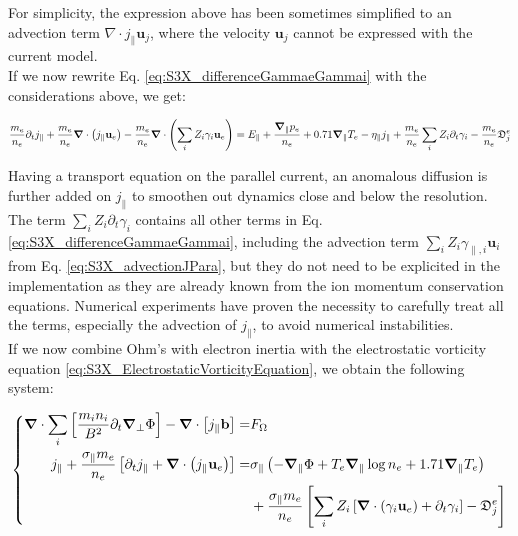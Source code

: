 For simplicity, the expression above has been sometimes simplified to an advection term $\nabla\cdot j_\parallel \mathbf{u}_j$, where the velocity $\mathbf{u}_j$ cannot be expressed with the current model. \\

If we now rewrite Eq. \ref{eq:S3X_differenceGammaeGammai} with the considerations above, we get: 

\begin{equation}
	\label{eq:S3X_OhmLawElectronInertia}
	\frac{m_e}{n_e}\partial_t j_\parallel + \frac{m_e}{n_e}\grad\cdot\left(j_\parallel\mathbf{u}_e\right)  - \frac{m_e}{n_e}\grad\cdot\left(\sum_i Z_i\gamma_i\mathbf{u}_e\right) = E_\parallel + \frac{\grad_\parallel p_e}{n_e} + 0.71\grad_\parallel T_e - \eta_\parallel j_\parallel + \frac{m_e}{n_e}\sum_i Z_i \partial_t \gamma_i - \frac{m_e}{n_e}\mathfrak{D}_j^e
\end{equation}

Having a transport equation on the parallel current, an anomalous diffusion is further added on $j_\parallel$ to smoothen out dynamics close and below the resolution. The term $\sum_i Z_i \partial_t \gamma_i$ contains all other terms in Eq. \ref{eq:S3X_differenceGammaeGammai}, including the advection term $\sum_i Z_i\gamma_{\parallel,i}\mathbf{u}_i$ from Eq. \ref{eq:S3X_advectionJPara}, but they do not need to be explicited in the implementation as they are already known from the ion momentum conservation equations. Numerical experiments have proven the necessity to carefully treat all the terms, especially the advection of $j_\parallel$, to avoid numerical instabilities. \\

If we now combine Ohm's with electron inertia with the electrostatic vorticity equation \ref{eq:S3X_ElectrostaticVorticityEquation}, we obtain the following system:

\begin{equation}
	\label{eq:S3X_vorticityEquation_ElectronInertia}
	\left\{
	\begin{aligned}
		\grad\cdot\sum_{i}\left[\frac{m_i n_i}{ B^2}\partial_t\grad_\perp\Phi\right] - \grad\cdot\left[j_\parallel\mathbf{b}\right]=& F_\Omega \\
		j_\parallel + \frac{\sigma_\parallel m_e}{n_e}\left[\partial_t j_\parallel + \grad\cdot\left(j_\parallel\mathbf{u}_e\right)\right] =& \sigma_\parallel \left(-\grad_\parallel\Phi + T_e\grad_\parallel\log n_e + 1.71\grad_\parallel T_e \right) \\ 
		& + \frac{\sigma_\parallel m_e}{n_e}\left[\sum_iZ_i\left[\grad\cdot\left(\gamma_i\mathbf{u}_e \right) + \partial_t \gamma_i\right] - \mathfrak{D}_j^e\right]
	\end{aligned}
	\right.
\end{equation}



